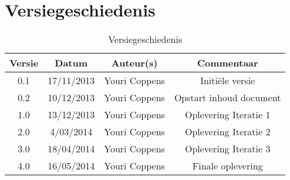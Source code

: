 \chapter{Versiegeschiedenis}

\begin{table}[htbp]
	\centering
	\begin{tabular} {|c|c|c|c|}
	    \hline
		\textbf{Versie} & \textbf{Datum} 	& \textbf{Auteur(s)} & \textbf{Commentaar} \\
		\hline
		0.1	& 17/11/2013	& Youri Coppens	& Initi\"{e}le versie\\
		\hline
		0.2	& 10/12/2013	& Youri Coppens	& Opstart inhoud document\\
		\hline
		1.0	& 13/12/2013	& Youri Coppens	& Oplevering Iteratie 1\\ 
		\hline
		2.0	& 4/03/2014	& Youri Coppens	& Oplevering Iteratie 2\\
		\hline
		3.0	& 18/04/2014	& Youri Coppens	& Oplevering Iteratie 3\\
		\hline
		4.0	& 16/05/2014	& Youri Coppens	& Finale oplevering\\
		\hline
	\end{tabular}
	\caption{Versiegeschiedenis}
\end{table}